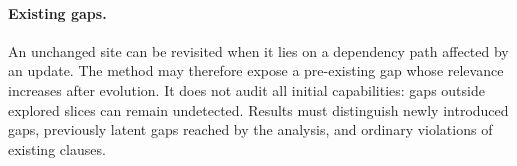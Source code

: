 \paragraph{Existing gaps.}
An unchanged site can be revisited when it lies on a dependency path affected by an update. The method may therefore expose a pre-existing gap whose relevance increases after evolution. It does not audit all initial capabilities: gaps outside explored slices can remain undetected. Results must distinguish newly introduced gaps, previously latent gaps reached by the analysis, and ordinary violations of existing clauses.
